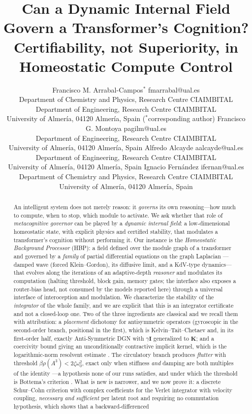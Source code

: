 \documentclass{article}
\title{Can a Dynamic Internal Field Govern a Transformer's Cognition?\\
Certifiability, not Superiority, in Homeostatic Compute Control}
\author{\name Francisco M. Arrabal-Campos$^{\ast}$ \email fmarrabal@ual.es\\
\addr Department of Chemistry and Physics, Research Centre CIAIMBITAL\\
\addr Department of Engineering, Research Centre CIAIMBITAL\\
\addr University of Almer\'ia, 04120 Almer\'ia, Spain \quad ($^{\ast}$corresponding author)
\AND
\name Francisco G. Montoya \email pagilm@ual.es\\
\addr Department of Engineering, Research Centre CIAIMBITAL\\
\addr University of Almer\'ia, 04120 Almer\'ia, Spain
\AND
\name Alfredo Alcayde \email aalcayde@ual.es\\
\addr Department of Engineering, Research Centre CIAIMBITAL\\
\addr University of Almer\'ia, 04120 Almer\'ia, Spain
\AND
\name Ignacio Fern\'andez \email ifernan@ual.es\\
\addr Department of Chemistry and Physics, Research Centre CIAIMBITAL\\
\addr University of Almer\'ia, 04120 Almer\'ia, Spain}
\begin{document}
\maketitle

\begin{abstract}
An intelligent system does not merely reason: it \emph{governs} its own
reasoning---how much to compute, when to stop, which module to activate. We ask
whether that role of \emph{metacognitive governor} can be played by a
\emph{dynamic internal field}: a low-dimensional homeostatic state, with explicit
physics and certified stability, that modulates a transformer's cognition
without performing it. Our instance is the \emph{Homeostatic Background Processor}
(HBP): a field defined over the module graph of a transformer and governed by a
\emph{family} of partial differential equations on the graph Laplacian
---damped wave (forced Klein--Gordon), its diffusive limit, and a KdV-type
dynamics--- that evolves along the iterations of an adaptive-depth
\emph{reasoner} and modulates its computation (halting threshold, block gain,
memory gates; the interface also exposes a router-bias head, not consumed by
the models reported here) through a universal interface of interoception and
modulation. We
characterize the stability of the \emph{integrator} of the whole family, and
we are explicit that this is an integrator certificate and not a closed-loop
one. Two of the three ingredients are classical and we recall them with
attribution: a \emph{placement} dichotomy for antisymmetric operators
(gyroscopic in the second-order branch, positional in the first), which is
Kelvin--Tait--Chetaev \citep{thomson1879treatise,merkin1997} and, in its
first-order half, exactly Anti-Symmetric DGN \citep{gravina2023adgn} with
$\gamma\mathbf{I}$ generalized to $\mathbf{K}$; and a coercivity bound giving
an unconditionally contractive implicit kernel, which is the logarithmic-norm
resolvent estimate \citep{dahlquist1958stability,soderlind2006logarithmic}.
The circulatory branch produces \emph{flutter} with threshold
$\beta\rho(A^3)<2\zeta\omega_0^2$, exact only when stiffness \emph{and}
damping are both multiples of the identity ---a hypothesis none of our runs
satisfies, and under which the threshold is Bottema's criterion
\citep{bottema1955stability}. What is new is narrower, and we now prove it: a discrete
Schur--Cohn criterion with complex coefficients for the Verlet integrator with
velocity coupling, \emph{necessary and sufficient} per latent root and
requiring no commutation hypothesis, which shows that a backward-differenced

\end{abstract}
\end{document}
